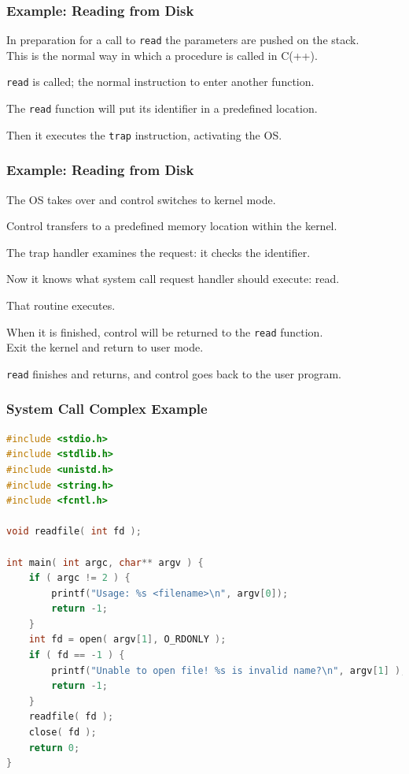 \begin{frame}
	\frametitle{Example: Reading from Disk}

	In preparation for a call to \texttt{read} the parameters are pushed on the stack.\\
	\quad This is the normal way in which a procedure is called in C(++).

	\texttt{read} is called; the normal instruction to enter another function.

	The \texttt{read} function will put its identifier in a predefined location.

	Then it executes the \texttt{trap} instruction, activating the OS.

\end{frame}

\begin{frame}
	\frametitle{Example: Reading from Disk}


	The OS takes over and control switches to kernel mode.

	Control transfers to a predefined memory location within the kernel.

	The trap handler examines the request: it checks the identifier.

	Now it knows what system call request handler should execute: read.

	That routine executes.

	When it is finished, control will be returned to the \texttt{read} function.\\
	\quad Exit the kernel and return to user mode.

	\texttt{read} finishes and returns, and control goes back to the user program.


\end{frame}


\begin{frame}[fragile]
	\frametitle{System Call Complex Example}

	\begin{lstlisting}[language=C]
#include <stdio.h>
#include <stdlib.h>
#include <unistd.h>
#include <string.h>
#include <fcntl.h>

void readfile( int fd );

int main( int argc, char** argv ) {
    if ( argc != 2 ) {
        printf("Usage: %s <filename>\n", argv[0]);
        return -1;
    }
    int fd = open( argv[1], O_RDONLY );
    if ( fd == -1 ) {
        printf("Unable to open file! %s is invalid name?\n", argv[1] );
        return -1;
    }
    readfile( fd );
    close( fd );
    return 0;
}
\end{lstlisting}
\end{frame}

